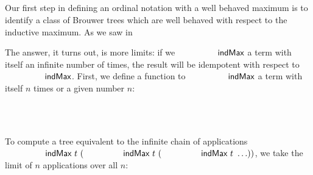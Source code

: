 \begin{code}[hide]
\AgdaSpace{}%
\AgdaSymbol{)}\AgdaSpace{}%
\<%
\\
%
\>[2]\AgdaSpace{}%
\AgdaSpace{}%
\AgdaSpace{}%
\AgdaSpace{}%
\AgdaSpace{}%
\AgdaSpace{}%
\<%
\\
%
\>[2]\AgdaSpace{}%
\AgdaSpace{}%
\AgdaSpace{}%
\AgdaSpace{}%
\AgdaSpace{}%
\AgdaSpace{}%
\AgdaSpace{}%
\<%
\\
%
\>[2]\<%
\\
\>[2][@{}l@{\AgdaIndent{0}}]%
\>[4]\AgdaSpace{}%
\AgdaSpace{}%
\<%
\end{code}

Our first step in defining an ordinal notation with a well behaved maximum
is to identify a class of Brouwer trees which are well behaved with
respect to the inductive maximum.
As we saw in

The answer, it turns out, is more limits:
if we $\indMax$ a term with itself an infinite number of times,
the result will be idempotent with respect to $\indMax$.
First, we define a function to $\indMax$ a term with itself $n$
times or a given number $n$:
\begin{code}%
%
\>[4]\AgdaSpace{}%
\AgdaSymbol{:}\AgdaSpace{}%
\AgdaSpace{}%
\AgdaSpace{}%
\AgdaSpace{}%
\AgdaSpace{}%
\<%
\\
%
\>[4]\AgdaSpace{}%
\AgdaSpace{}%
\AgdaSpace{}%
\AgdaSymbol{=}\AgdaSpace{}%
\<%
\\
%
\>[4]\AgdaSpace{}%
\AgdaSpace{}%
\AgdaSymbol{(}\AgdaSpace{}%
\AgdaSymbol{)}\AgdaSpace{}%
\AgdaSymbol{=}\AgdaSpace{}%
\AgdaSpace{}%
\AgdaSymbol{(}\AgdaSpace{}%
\AgdaSpace{}%
\AgdaSymbol{)}\AgdaSpace{}%
\<%
\end{code}

To compute
a tree equivalent to the infinite
chain of applications $\indMax\ t\ (\indMax\ t\ (\indMax\ t\ \ldots))$,
we take the limit of $n$ applications over all $n$:
\begin{code}%
%
\>[4]\AgdaSpace{}%
\AgdaSymbol{:}\AgdaSpace{}%
\AgdaSpace{}%
\AgdaSpace{}%
\<%
\\
%
\>[4]\AgdaSpace{}%
\AgdaSpace{}%
\AgdaSymbol{=}%
\>[17]\AgdaSpace{}%
\AgdaSpace{}%
\AgdaSpace{}%
\AgdaSpace{}%
\AgdaSpace{}%
\AgdaSpace{}%
\AgdaSymbol{)}\<%
\end{code}

